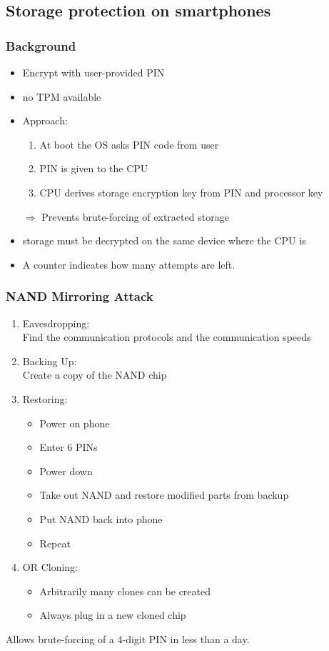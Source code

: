 \subsection{Storage protection on smartphones}
\subsubsection{Background}
\begin{itemize}
  \item Encrypt with user-provided PIN
  \item no TPM available
  \item Approach:
    \begin{enumerate}
      \item At boot the OS asks PIN code from user
      \item PIN is given to the CPU
      \item CPU derives storage encryption key from PIN and processor key
    \end{enumerate}
    $\Rightarrow$ Prevents brute-forcing of extracted storage
  \item storage must be decrypted on the same device where the CPU is
  \item A counter indicates how many attempts are left.
\end{itemize}

\subsubsection{NAND Mirroring Attack}
\begin{enumerate}
  \item  Eavesdropping:\\
    Find the communication protocols and the communication speeds
  \item Backing Up:\\
    Create a copy of the NAND chip
  \item Restoring:
    \begin{itemize}
      \item Power on phone
      \item Enter 6 PINs
      \item Power down
      \item Take out NAND and restore modified parts from backup
      \item Put NAND back into phone
      \item Repeat
    \end{itemize}
  \item OR Cloning:
    \begin{itemize}
      \item Arbitrarily many clones can be created
      \item Always plug in a new cloned chip
    \end{itemize}
\end{enumerate}
Allows brute-forcing of a 4-digit PIN in less than a day.
